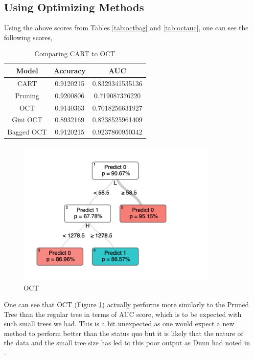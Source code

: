 \documentclass[11pt,a4paper]{report}
\begin{document}
\subsection{Using Optimizing Methods}
Using the above scores from Tables \ref{tab:octbag} and \ref{tab:octauc}, one can see the following scores,
\begin{table}
    \centering
    \begin{tabular}{|c|c|c|}
        \hline
        \textbf{Model} & \textbf{Accuracy} & \textbf{AUC}  \\
        \hline
        CART & 0.9120215 & 0.8329341535136 \\
        \hline
        Pruning & 0.9200806 & 0.719087376220 \\
        \hline
        OCT & 0.9140363 & 0.7018256631927 \\
        \hline
        Gini OCT & 0.8932169 & 0.8238525961409 \\
        \hline
        Bagged OCT & 0.9120215 & 0.9237860950342 \\
        \hline
    \end{tabular}
    \caption{Comparing CART to OCT}
    \label{tab:cartoctclass}
\end{table}
\begin{figure}
    \centering
    \includegraphics[width = 10cm]{reportcharts/oct1.png}
    \caption{OCT}
    \label{fig:octplayoff}
\end{figure}
One can see that OCT (Figure \ref{fig:octplayoff}) actually performs more similarly to the Pruned Tree than the regular tree in terms of AUC score, which is to be expected with such small trees we had.
This is a bit unexpected as one would expect a new method to perform better than the status quo but it is likely that the nature of the data and the small tree size has led to this poor output as Dunn had noted in \cite{oct}.
\end{document}
